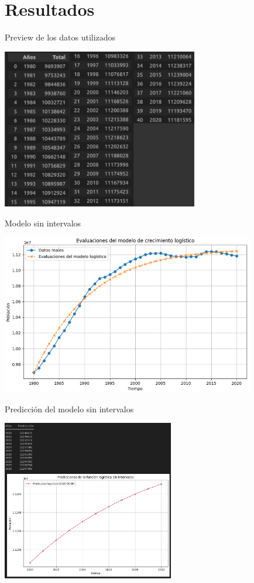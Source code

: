 \documentclass{beamer}
\begin{document}
\section{Resultados}
\begin{frame}{Preview de los datos utilizados}
    \begin{center}
        \includegraphics[height = 7cm]{img/data.png}
    \end{center}
\end{frame}
\begin{frame}{Modelo sin intervalos}
    \begin{center}
    \includegraphics[height = 7cm]{img/real_vs_pred.png}
    \end{center}
\end{frame}

\begin{frame}{Predicción del modelo sin intervalos}
    \begin{center}
        \includegraphics[height = 7cm]{img/graph_sin_intervalos.png}
    \end{center}
\end{frame}
\end{document}
